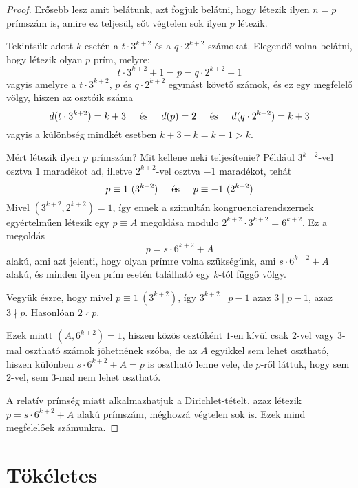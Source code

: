 \documentclass[12pt]{book}
\theoremstyle{plain} %
\theoremstyle{definition} %
\theoremstyle{remark}
\numberwithin{equation}{section}  %
\begin{document}
	\begin{proof}
		Erősebb lesz amit belátunk, azt fogjuk belátni, hogy létezik ilyen $n = p$ prímszám is, amire ez teljesül, sőt végtelen sok ilyen $p$ létezik.
		
		Tekintsük adott $k$ esetén a $t\cdot 3^{k+2}$ és a $q\cdot 2^{k+2}$ számokat. Elegendő volna belátni, hogy létezik olyan $p$ prím, melyre:
		\[ t\cdot 3^{k+2} + 1 = p = q\cdot 2^{k+2} - 1  \]
		vagyis amelyre a $t\cdot 3^{k+2}$, $p$ és $q\cdot 2^{k+2}$ egymást követő számok, és ez egy megfelelő völgy, hiszen az osztóik száma
		\[ d(t\cdot 3^{k+2}) = k+3 \hspace{5mm} \text{és} \hspace{5mm} d(p) = 2 \hspace{5mm} \text{és} \hspace{5mm} d(q\cdot 2^{k+2}) = k+3  \]
		vagyis a különbség mindkét esetben $k+3-k=k+1>k$.
		
		Mért létezik ilyen $p$ prímszám? Mit kellene neki teljesítenie? Például $3^{k+2}$-vel osztva $1$ maradékot ad, illetve $2^{k+2}$-vel osztva $-1$ maradékot, tehát
		\[ p\equiv 1\ (3^{k+2}) \hspace{5mm} \text{és} \hspace{5mm} p\equiv -1\ (2^{k+2})  \]
		Mivel $(3^{k+2},2^{k+2}) = 1$, így ennek a szimultán kongruenciarendszernek egyértelműen létezik egy $p\equiv A$ megoldása modulo $2^{k+2}\cdot 3^{k+2} = 6^{k+2}$. Ez a megoldás
		\[ p = s \cdot 6^{k+2} + A  \]
		alakú, ami azt jelenti, hogy olyan prímre volna szükségünk, ami $s\cdot 6^{k+2} + A$ alakú, és minden ilyen prím esetén található egy $k$-tól függő völgy.
		
		Vegyük észre, hogy mivel $p\equiv 1\ (3^{k+2})$, így $3^{k+2}\mid p-1$ azaz $3\mid p-1$, azaz $3\nmid p$. Hasonlóan $2\nmid p$. 
		
		Ezek miatt $(A,6^{k+2}) = 1$, hiszen közös osztóként $1$-en kívül csak $2$-vel vagy $3$-mal osztható számok jöhetnének szóba, de az $A$ egyikkel sem lehet osztható, hiszen különben $s\cdot 6^{k+2} + A = p$ is osztható lenne vele, de $p$-ről láttuk, hogy sem $2$-vel, sem $3$-mal nem lehet osztható.
		
		A relatív prímség miatt alkalmazhatjuk a Dirichlet-tételt, azaz létezik $p = s\cdot 6^{k+2} + A$ alakú prímszám, méghozzá végtelen sok is. Ezek mind megfelelőek számunkra.
	\end{proof}
	
	
	
	\section{Tökéletes}
	
\end{document}
